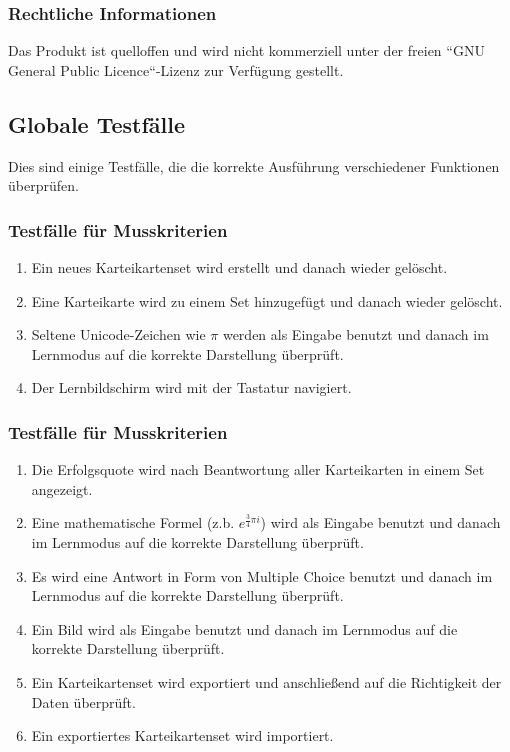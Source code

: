 \subsubsection{Rechtliche Informationen}
Das Produkt ist quelloffen und wird nicht kommerziell unter der freien ``GNU General Public Licence``-Lizenz zur Verfügung gestellt. 

\newpage
\subsection{Globale Testfälle}
Dies sind einige Testfälle, die die korrekte Ausführung verschiedener Funktionen überprüfen.

\subsubsection{Testfälle für Musskriterien}
\begin{enumerate}[leftmargin=2cm, label=\bfseries /TM\arabic*0/]
	\item Ein neues Karteikartenset wird erstellt und danach wieder gelöscht.
	\item Eine Karteikarte wird zu einem Set hinzugefügt und danach wieder gelöscht.
	\item Seltene Unicode-Zeichen wie \(\pi\) werden als Eingabe benutzt und danach im Lernmodus auf die korrekte Darstellung überprüft.
	\item Der Lernbildschirm wird mit der Tastatur navigiert.
\end{enumerate}

\subsubsection{Testfälle für Musskriterien}
\begin{enumerate}[leftmargin=2cm, label=\bfseries /TW\arabic*0/]
	\item Die Erfolgsquote wird nach Beantwortung aller Karteikarten in einem Set angezeigt.
	\item Eine mathematische Formel (z.b. \( e^{\frac{3}{4}\pi i}\)) wird als Eingabe benutzt und danach im Lernmodus auf die korrekte Darstellung überprüft.
	\item Es wird eine Antwort in Form von Multiple Choice benutzt und danach im Lernmodus auf die korrekte Darstellung überprüft.
	\item Ein Bild wird als Eingabe benutzt und danach im Lernmodus auf die korrekte Darstellung überprüft.
	\item\label{test-export} Ein Karteikartenset wird exportiert und anschließend auf die Richtigkeit der Daten überprüft.
	\item Ein exportiertes Karteikartenset wird importiert.
\end{enumerate}


